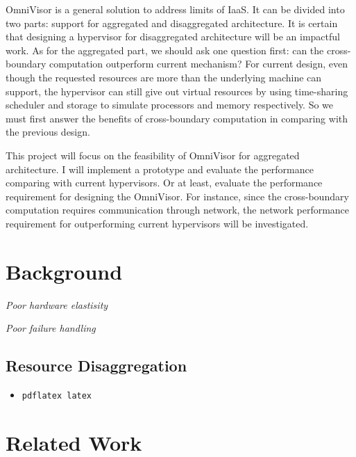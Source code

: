 \documentclass[twocolumn]{article}
\begin{document}
    OmniVisor is a general solution to address limits of IaaS. It can be divided into two parts: support for aggregated and disaggregated architecture. It is certain that designing a hypervisor for disaggregated architecture will be an impactful work. As for the aggregated part, we should ask one question first: can the cross-boundary computation outperform current mechanism? For current design, even though the requested resources are more than the underlying machine can support, the hypervisor can still give out virtual resources by using time-sharing scheduler and storage to simulate processors and memory respectively. So we must first answer the benefits of cross-boundary computation in comparing with the previous design. \par
    This project will focus on the feasibility of OmniVisor for aggregated architecture. I will implement a prototype and evaluate the performance comparing with current hypervisors. Or at least, evaluate the performance requirement for designing the OmniVisor. For instance, since the cross-boundary computation requires communication through network, the network performance requirement for outperforming current hypervisors will be investigated. \par

\section{Background}

\emph{Poor hardware elastisity}

\emph{Poor failure handling}


\subsection{Resource Disaggregation}


\begin{itemize}
\item \texttt{pdflatex latex}
\end{itemize}

\section{Related Work}
\end{document}
